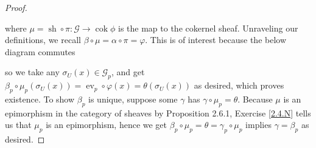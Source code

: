 \documentclass{article}
\newcommand{\fF}{\mathscr{F}}
\newcommand{\fG}{\mathscr{G}}
\DeclareMathOperator{\cok}{\mathrm{cok}}
\DeclareMathOperator{\sh}{sh}
\DeclareMathOperator{\ev}{ev}
\begin{document}
\begin{proof}
    \begin{center}
    \end{center}
    where $\mu=\sh \circ \pi:\fG\to \cok \phi$ is the map to the cokernel sheaf. Unraveling our definitions, we recall $\beta \circ \mu = \alpha \circ \pi = \varphi$. This is of interest because the below diagram commutes
    \begin{center}
    \end{center}
    so we take any $\sigma_U(x)\in \fG_p$, and get $\beta_p\circ \mu_p (\sigma_U(x))= \ev_p \circ \varphi(x)=\theta( \sigma_U(x))$ as desired, which proves existence. To show $\beta_p$ is unique, suppose some $\gamma$ has $\gamma \circ \mu_p = \theta$. Because $\mu$ is an epimorphism in the category of sheaves by Proposition 2.6.1, Exercise \ref{2.4.N} tells us that $\mu_p$ is an epimorphism, hence we get $\beta_p \circ \mu_p = \theta = \gamma_p \circ \mu_p $ implies $\gamma = \beta_p$ as desired.
\end{proof}
\end{document}
